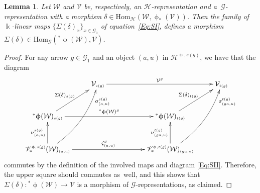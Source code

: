 \documentclass[pdftex]{sigma}
\numberwithin{equation}{section}
\newtheorem{Lemma}[Theorem]{Lemma}
\renewcommand{\hom}[3]{\mathrm{Hom}_{\Sscript{#1}}\left(#2, #3\right)}
\newcommand{\Go}{\cG_{\Sscript{0}}}
\newcommand{\Ga}{\cG_{\Sscript{1}}}
\newcommand{\Vg}{\cV^{\Sscript{g}}}
\newcommand{\vV}{\mathscr{V}}
\newcommand{\cG}{{\mathcal G}}
\newcommand{\cH}{{\mathcal H}}
\newcommand{\cV}{{\mathcal V}}
\newcommand{\cW}{{\mathcal W}}
\newcommand{\Sscript}[1]{\scriptscriptstyle{#1}}
\begin{document}
\begin{Lemma}\label{lema:Sigma}Let $\cW$ and $\cV$ be, respectively, an $\cH$-representation and a~$\cG$-representation with a morphism $\delta \in \hom{\cH}{\cW}{\upphi_{*}(\cV)}$. Then the family of $\Bbbk$-linear
maps $\big\{ \Sigma(\delta)_{\Sscript{x}} \big\}_{\Sscript{ x \in \Go}}$ of equation~\eqref{Eq:SI}, defines a morphism $\Sigma(\delta) \in \hom{\cG}{{}^*\upphi(\cW)}{\cV}$.
\end{Lemma}
\begin{proof}For any arrow $g \in \Ga$ and an object $(a,u)$ in $\cH^{\Sscript{\upphi, s(g)}}$, we have that the diagram
\begin{gather*}
\xymatrix@R=30pt{ & \cV_{\Sscript{s(g)}} \ar@{->}^-{\Vg}[rrr] & & &
\cV_{\Sscript{t(g)}} \\ {}^*\upphi(\cW)_{\Sscript{s(g)}}
\ar@{->}^-{{}^*\upphi(\cW)^g}[rrr]
\ar@{->}^-{\Sigma(\delta)_{\Sscript{s(g)}}}[ur] & & &
{}^*\upphi(\cW)_{\Sscript{t(g)}}
\ar@{->}^-{\Sigma(\delta)_{\Sscript{t(g)}}}[ur] & \\
\vV^{\Sscript{\upphi, s(g)}}_*(\cW)_{\Sscript{(a, u)}}
\ar@{->}@/_1pc /_->>>>{\upsigma^{\Sscript{s(g)}}_{\Sscript{(a,
u)}}}[uur] \ar@{->}^-{\zeta^g_{(a, u)}}[rrr]
\ar@{->}^-{\upupsilon^{\Sscript{s(g)}}_{\Sscript{(a, u)}}}[u] & &
& \ar@{->}^-{\upupsilon^{\Sscript{t(g)}}_{\Sscript{(ga, u)}}}[u]
\ar@{->}@/_1pc /_->>>>{\upsigma^{\Sscript{t(g)}}_{\Sscript{(ga,
u)}}}[uur] \vV^{\Sscript{\upphi, t(g)}}_*(\cW)_{\Sscript{(ga,
u)}} & }
\end{gather*}
commutes by the definition of the involved maps and diagram \eqref{Eq:SII}. Therefore, the upper square should commutes as~well, and this shows that $\Sigma(\delta)\colon {}^*\upphi(\cW) \to \cV $ is a morphism of $\cG$-representations, as claimed.
\end{proof}
\end{document}
